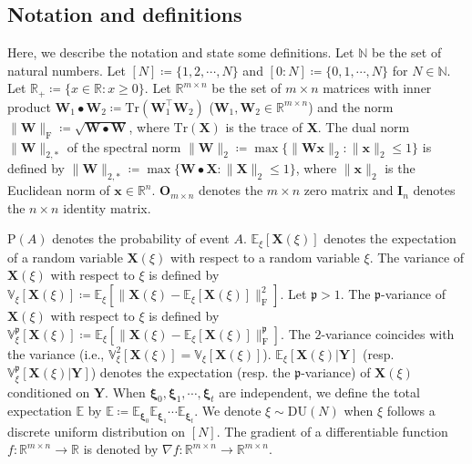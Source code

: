 \documentclass[twoside,11pt]{article}
\begin{document}
\subsection*{Notation and definitions}
Here, we describe the notation and state some definitions. Let $\mathbb{N}$ be the set of natural numbers. Let $[N] \coloneqq \{1,2,\cdots,N\}$ and $[0:N] \coloneqq \{0,1,\cdots,N\}$ for $N \in \mathbb{N}$. Let $\mathbb{R}_+ \coloneqq \{ x \in \mathbb{R} \colon x \geq 0 \}$. Let $\mathbb{R}^{m \times n}$ be the set of $m \times n$ matrices with inner product $\bm{W}_1 \bullet \bm{W}_2 \coloneqq \mathrm{Tr}(\bm{W}_1^\top \bm{W}_2)$ ($\bm{W}_1, \bm{W}_2 \in \mathbb{R}^{m \times n}$) and the norm $\|\bm{W}\|_{\mathrm{F}} \coloneqq \sqrt{\bm{W} \bullet \bm{W}}$, where $\mathrm{Tr}(\bm{X})$ is the trace of $\bm{X}$. The dual norm $\|\bm{W}\|_{2,*}$ of the spectral norm $\|\bm{W}\|_{2} \coloneqq \max \{ \| \bm{W} \bm{x} \|_2 \colon \|\bm{x}\|_2 \leq 1 \}$ is defined by $\|\bm{W}\|_{2,*} \coloneqq \max \{ \bm{W} \bullet \bm{X} \colon \|\bm{X} \|_{2} \leq 1 \}$, where $\|\bm{x}\|_2$ is the Euclidean norm of $\bm{x} \in \mathbb{R}^n$. $\bm{O}_{m \times n}$ denotes the $m \times n$ zero matrix and $\bm{I}_n$ denotes the $n \times n$ identity matrix.

$\mathrm{P}(A)$ denotes the probability of event $A$. $\mathbb{E}_\xi [\bm{X}(\xi)]$ denotes the expectation of a random variable $\bm{X}(\xi)$ with respect to a random variable $\xi$. The variance of $\bm{X}(\xi)$ with respect to $\xi$ is defined by $\mathbb{V}_\xi [\bm{X}(\xi)] \coloneqq \mathbb{E}_\xi [\| \bm{X}(\xi) - \mathbb{E}_\xi [\bm{X}(\xi)] \|_{\mathrm{F}}^2]$. Let $\mathfrak{p} > 1$. The $\mathfrak{p}$-variance of $\bm{X}(\xi)$ with respect to $\xi$ is defined by $\mathbb{V}_\xi^{\mathfrak{p}} [\bm{X}(\xi)] \coloneqq \mathbb{E}_\xi [\| \bm{X}(\xi) - \mathbb{E}_\xi [\bm{X}(\xi)] \|_{\mathrm{F}}^{\mathfrak{p}}]$. The $2$-variance coincides with the variance (i.e., $\mathbb{V}_\xi^{2} [\bm{X}(\xi)] = \mathbb{V}_\xi [\bm{X}(\xi)]$). $\mathbb{E}_\xi [\bm{X}(\xi)|\bm{Y}]$ (resp. $\mathbb{V}_\xi^{\mathfrak{p}} [\bm{X}(\xi)|\bm{Y}]$) denotes the expectation (resp. the $\mathfrak{p}$-variance) of $\bm{X}(\xi)$ conditioned on $\bm{Y}$. When $\bm{\xi}_0, \bm{\xi}_1, \cdots, \bm{\xi}_t$ are independent, we define the total expectation $\mathbb{E}$ by $\mathbb{E} \coloneqq \mathbb{E}_{\bm{\xi}_0} \mathbb{E}_{\bm{\xi}_1} \cdots \mathbb{E}_{\bm{\xi}_t}$. We denote $\xi \sim \mathrm{DU}(N)$ when $\xi$ follows a discrete uniform distribution on $[N]$. The gradient of a differentiable function $f \colon \mathbb{R}^{m \times n} \to \mathbb{R}$ is denoted by $\nabla f \colon \mathbb{R}^{m \times n} \to \mathbb{R}^{m \times n}$.
\end{document}
